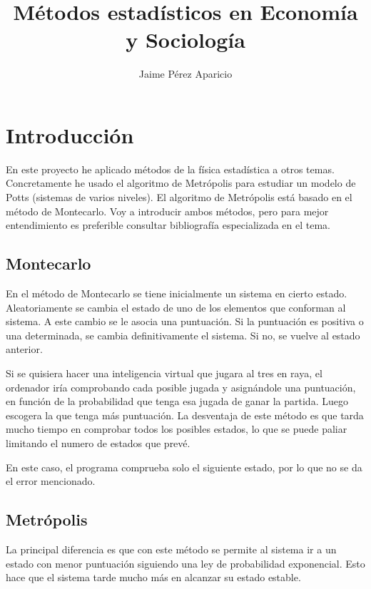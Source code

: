 \documentclass[a4paper,10pt,twocolumn]{article}
\author{Jaime P\'erez Aparicio}
\title{M\'etodos estad\'isticos en Econom\'ia y Sociolog\'ia}
\begin{document}
\maketitle

\section*{Introducci\'on}

En este proyecto he aplicado m\'etodos de la f\'isica estad\'istica a otros temas. Concretamente he usado el algoritmo de Metr\'opolis para estudiar un modelo de Potts (sistemas de varios niveles). El algoritmo de Metr\'opolis est\'a basado en el m\'etodo de Montecarlo. Voy a introducir ambos m\'etodos, pero para mejor entendimiento es preferible consultar bibliograf\'ia especializada en el tema.

\subsection*{Montecarlo}

En el m\'etodo de Montecarlo se tiene inicialmente un sistema en cierto estado. Aleatoriamente se cambia el estado de uno de los elementos que conforman al sistema. A este cambio se le asocia una puntuaci\'on. Si la puntuaci\'on es positiva o una determinada, se cambia definitivamente el sistema. Si no, se vuelve al estado anterior. 

Si se quisiera hacer una inteligencia virtual que jugara al tres en raya, el ordenador ir\'ia comprobando cada posible jugada y asign\'andole una puntuaci\'on, en funci\'on de la probabilidad que tenga esa jugada de ganar la partida. Luego escogera la que tenga m\'as puntuaci\'on. La desventaja de este m\'etodo es que tarda mucho tiempo en comprobar todos los posibles estados, lo que se puede paliar limitando el numero de estados que prev\'e. 

En este caso, el programa comprueba solo el siguiente estado, por lo que no se da el error mencionado.

\subsection*{Metr\'opolis}

La principal diferencia es que con este m\'etodo se permite al sistema ir a un estado con menor puntuaci\'on siguiendo una ley de probabilidad exponencial. Esto hace que el sistema tarde mucho m\'as en alcanzar su estado estable.
\end{document}
